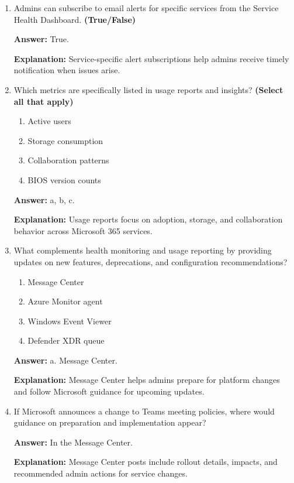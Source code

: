 \documentclass[10pt]{article}
\begin{document}
\begin{enumerate}[leftmargin=*]
\textbf{Explanation:} Service health reporting covers current issues, planned changes, and the progress toward resolution.

\item Admins can subscribe to email alerts for specific services from the Service Health Dashboard. \textbf{(True/False)}

\textbf{Answer:} True.

\textbf{Explanation:} Service-specific alert subscriptions help admins receive timely notification when issues arise.

\item Which metrics are specifically listed in usage reports and insights? \textbf{(Select all that apply)}
\begin{enumerate}[label=\alph*., leftmargin=1.5em]
\item Active users
\item Storage consumption
\item Collaboration patterns
\item BIOS version counts
\end{enumerate}
\textbf{Answer:} a, b, c.

\textbf{Explanation:} Usage reports focus on adoption, storage, and collaboration behavior across Microsoft 365 services.

\item What complements health monitoring and usage reporting by providing updates on new features, deprecations, and configuration recommendations?
\begin{enumerate}[label=\alph*., leftmargin=1.5em]
\item Message Center
\item Azure Monitor agent
\item Windows Event Viewer
\item Defender XDR queue
\end{enumerate}
\textbf{Answer:} a. Message Center.

\textbf{Explanation:} Message Center helps admins prepare for platform changes and follow Microsoft guidance for upcoming updates.

\item If Microsoft announces a change to Teams meeting policies, where would guidance on preparation and implementation appear?

\textbf{Answer:} In the Message Center.

\textbf{Explanation:} Message Center posts include rollout details, impacts, and recommended admin actions for service changes.


\end{enumerate}
\end{document}
